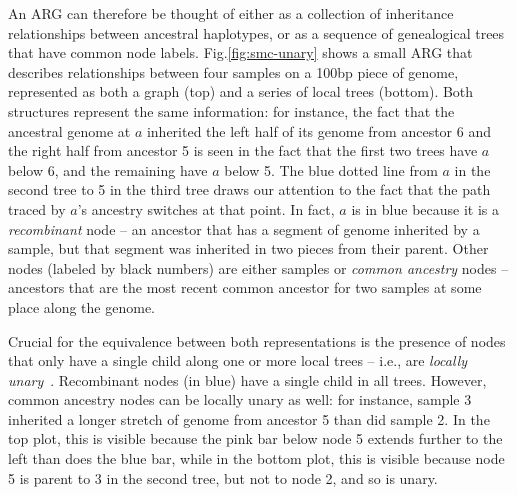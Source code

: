 \documentclass{article}
\begin{document}
An ARG can therefore be thought of either as a collection of inheritance
relationships between ancestral haplotypes,
or as a sequence of genealogical trees that have common node labels.
Fig.\ref{fig:smc-unary} shows a small ARG
that describes relationships between four samples on a 100bp piece of genome,
represented as both a graph (top) and a series of local trees (bottom).
Both structures represent the same information:
for instance, the fact that the ancestral genome at $a$
inherited the left half of its genome from ancestor 6
and the right half from ancestor 5
is seen in the fact that the first two trees have $a$ below 6,
and the remaining have $a$ below 5.
The blue dotted line from $a$ in the second tree to 5 in the third tree
draws our attention to the fact that
the path traced by $a$'s ancestry switches at that point.
In fact, $a$ is in blue because it is a \emph{recombinant} node --
an ancestor that has a segment of genome inherited by a sample,
but that segment was inherited in two pieces from their parent.
Other nodes (labeled by black numbers) are either samples
or \emph{common ancestry} nodes --
ancestors that are the most recent common ancestor for two samples
at some place along the genome.

Crucial for the equivalence between both representations is the presence of
nodes that only have a single child along one or more local trees --
i.e., are \emph{locally unary}~\citep{wong_general_2023}.
Recombinant nodes (in blue) have a single child in all trees.
However, common ancestry nodes can be locally unary as well:
for instance, sample 3 inherited a longer stretch of genome from ancestor 5
than did sample 2.
In the top plot, this is visible because the pink bar below node 5
extends further to the left than does the blue bar,
while in the bottom plot, this is visible because node 5 is parent to 3
in the second tree, but not to node 2, and so is unary.
\end{document}
